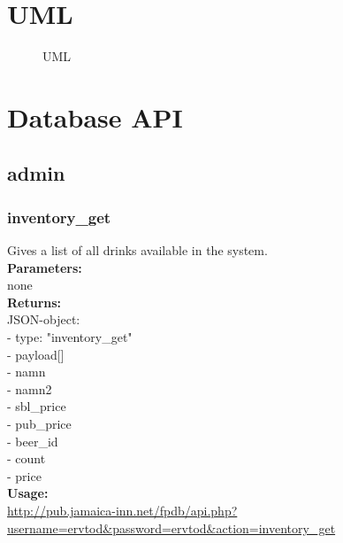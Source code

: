 \documentclass{article}
\begin{document}
\clearpage
\section{UML}
\begin{figure}[!htb]
\centering
{}
\caption{UML}
\label{fig:uml}
\end{figure}

\clearpage
\section{Database API}
\subsection{admin}
\subsubsection{inventory\_get}
Gives a list of all drinks available in the system.\\
\textbf{Parameters:}\\
none\\
\textbf{Returns:}\\
JSON-object:\\
- type: "inventory\_get"\\
- payload[]\\
\indent - namn\\
\indent - namn2\\
\indent - sbl\_price\\
\indent - pub\_price\\
\indent - beer\_id\\
\indent - count\\
\indent - price\\
\textbf{Usage:}\\
\url{http://pub.jamaica-inn.net/fpdb/api.php?username=ervtod\&password=ervtod\&action=inventory\_get}\\
\end{document}
